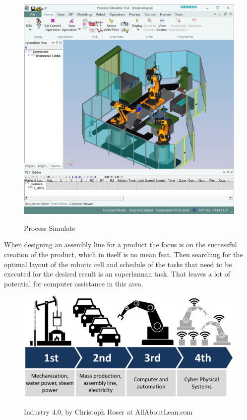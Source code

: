 \begin{figure}[h]
	\caption{Process Simulate}
	\centering
	  \includegraphics[width=1\textwidth]{process-simulate}
	\label{fig:ProcessSimulate}
\end{figure}

When designing an assembly line for a product the focus is on the successful creation of the product, which in itself is no mean feat. 
Then searching for the optimal layout of the robotic cell and schedule of the tasks that need to be executed for the desired result is an superhuman task. That leaves a lot of potential for computer assistance in this area. \\ 

\begin{figure}[h]
	\caption{Industry 4.0, by Christoph Roser at AllAboutLean.com}
	\centering
	  \includegraphics[width=1\textwidth]{industry-40.png}
	\label{fig:Industry40}
\end{figure}

